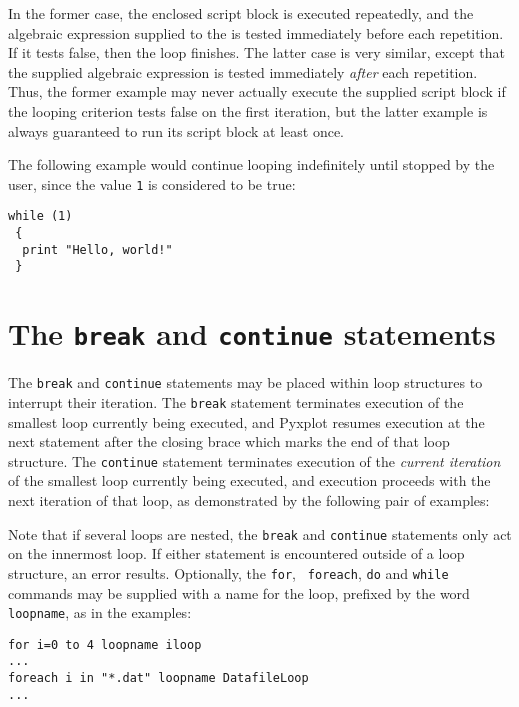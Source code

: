 In the former case, the enclosed script block is executed repeatedly, and the
algebraic expression supplied to the  is tested immediately
before each repetition. If it tests false, then the loop finishes.  The latter
case is very similar, except that the supplied algebraic expression is tested
immediately {\it after} each repetition. Thus, the former example may never
actually execute the supplied script block if the looping criterion tests false
on the first iteration, but the latter example is always guaranteed to run
its script block at least once.

The following example would continue looping indefinitely until stopped by the
user, since the value {\tt 1} is considered to be true:

\begin{verbatim}
while (1)
 {
  print "Hello, world!"
 }
\end{verbatim}

\section{The {\tt break} and {\tt continue} statements}
\label{sec:breakcontinue}

The {\tt break} and {\tt continue} statements may be placed within loop
structures to interrupt their iteration. The {\tt break} statement terminates
execution of the smallest loop currently being executed, and Pyxplot resumes
execution at the next statement after the closing brace which marks the end of
that loop structure. The {\tt continue} statement terminates execution of the
{\it current iteration} of the smallest loop currently being executed, and
execution proceeds with the next iteration of that loop, as demonstrated by the
following pair of examples:

\vspace{3mm}

\vspace{3mm}

Note that if several loops are nested, the {\tt break} and {\tt continue}
statements only act on the innermost loop. If either statement is encountered
outside of a loop structure, an error results. Optionally, the {\tt for}, {\tt
foreach}, {\tt do} and {\tt while} commands may be supplied with a name for the
loop, prefixed by the word {\tt loopname}, as in the examples:

\begin{verbatim}
for i=0 to 4 loopname iloop
...
foreach i in "*.dat" loopname DatafileLoop
...
\end{verbatim}

